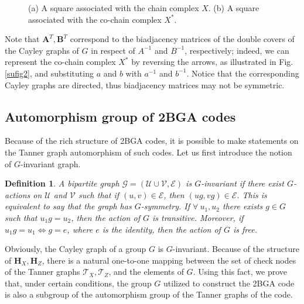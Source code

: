 \documentclass[a4paper,twocolumn,11pt,accepted=2026-05-03]{quantumarticle}
\newtheorem{definition}{Definition}
\newcommand{\setu}{\mathcal{U}}
\newcommand{\setv}{\mathcal{V}}
\newcommand{\sete}{\mathcal{E}}
\newcommand{\setg}{\mathcal{G}}
\begin{document}
\begin{figure}
\centering
\begin{minipage}[t]{0.48\textwidth}
\centering

\subcaption{}
\label{sufig1}
\end{minipage}%
\hfill%
\begin{minipage}[t]{0.48\textwidth}
\centering

\subcaption{}
\label{sufig2}
\end{minipage}
\caption{(a) A square associated with the chain complex $X$. (b) A square associated with the co-chain complex $X^*$. }
\label{fig:square}
\end{figure}



Note that $\mathbf{A}^T,\mathbf{B}^T$ correspond to the biadjacency matrices of the double covers of the Cayley graphs of $G$ in respect of $A^{-1}$ and $B^{-1}$, respectively; indeed, we can represent the co-chain complex $X^*$ by reversing the arrows, as illustrated in Fig. \ref{sufig2}, and substituting $a$ and $b$ with $a^{-1}$ and $b^{-1}$. Notice that the corresponding Cayley graphs are directed, thus biadjacency matrices may not be symmetric.

\subsection{Automorphism group of 2BGA codes}
Because of the rich structure of 2BGA codes, it is possible to make statements on the Tanner graph automorphism of such codes. Let us first introduce the notion of $G$-invariant graph.

\begin{definition}
\label{def:action}
 A bipartite graph $\setg = (\setu\cup \setv,\sete)$ is $G$-invariant if there exist $G$-actions on $\setu$ and $\setv$ such that if $(u,v) \in \sete$, then $(ug,vg) \in \sete$. This is equivalent to say that the graph has $G$-symmetry. If $\forall\ u_1,u_2$ there exists $g\in G$ such that $u_1g=u_2$, then the action of $G$ is transitive. Moreover, if $u_1g=u_1 \iff g=e$, where $e$ is the identity, then the action of $G$ is free.
\end{definition}


Obviously, the Cayley graph of a group $G$ is $G$-invariant. Because of the structure of $\mathbf{H}_X,\mathbf{H}_Z$, there is a natural one-to-one mapping between the set of check nodes of the Tanner graphs $\mathcal{T}_X,\mathcal{T}_Z$, and the elements of $G$.
Using this fact, we prove that, under certain conditions, the group $G$ utilized to construct the 2BGA code is also a subgroup of the automorphism group of the Tanner graphs of the code.
\end{document}
